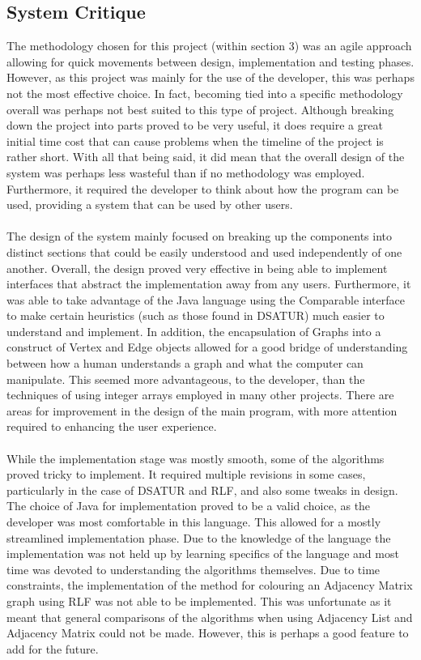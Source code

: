 \subsection{System Critique}
The methodology chosen for this project (within section 3) was an agile approach allowing for quick movements between design, implementation and testing phases. However, as this project was mainly for the use of the developer, this was perhaps not the most effective choice. In fact, becoming tied into a specific methodology overall was perhaps not best suited to this type of project. Although breaking down the project into parts proved to be very useful, it does require a great initial time cost that can cause problems when the timeline of the project is rather short. With all that being said, it did mean that the overall design of the system was perhaps less wasteful than if no methodology was employed. Furthermore, it required the developer to think about how the program can be used, providing a system that can be used by other users. 
\\\\
The design of the system mainly focused on breaking up the components into distinct sections that could be easily understood and used independently of one another. Overall, the design proved very effective in being able to implement interfaces that abstract the implementation away from any users. Furthermore, it was able to take advantage of the Java language using the Comparable interface to make certain heuristics (such as those found in DSATUR) much easier to understand and implement. In addition, the encapsulation of Graphs into a construct of Vertex and Edge objects allowed for a good bridge of understanding between how a human understands a graph and what the computer can manipulate. This seemed more advantageous, to the developer, than the techniques of using integer arrays employed in many other projects. There are areas for improvement in the design of the main program, with more attention required to enhancing the user experience. 
\\\\
While the implementation stage was mostly smooth, some of the algorithms proved tricky to implement. It required multiple revisions in some cases, particularly in the case of DSATUR and RLF, and also some tweaks in design. The choice of Java for implementation proved to be a valid choice, as the developer was most comfortable in this language. This allowed for a mostly streamlined implementation phase. Due to the knowledge of the language the implementation was not held up by learning specifics of the language and most time was devoted to understanding the algorithms themselves. Due to time constraints, the implementation of the method for colouring an Adjacency Matrix graph using RLF was not able to be implemented. This was unfortunate as it meant that general comparisons of the algorithms when using Adjacency List and Adjacency Matrix could not be made. However, this is perhaps a good feature to add for the future. 
